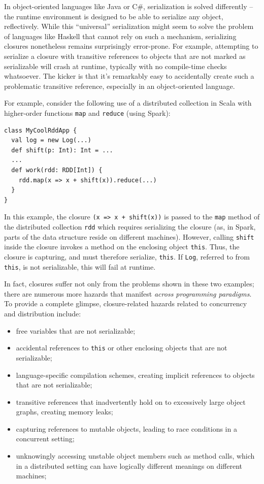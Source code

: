 \documentclass{llncs}
\begin{document}
In object-oriented languages like Java or C\#, serialization is solved
differently -- the runtime environment is designed to be able to serialize any
object, reflectively. While this ``universal'' serialization might seem to
solve the problem of languages like Haskell that cannot rely on such a
mechanism, serializing closures nonetheless remains surprisingly error-prone.
For example, attempting to serialize a closure with transitive references to
objects that are not marked as serializable will crash at runtime, typically
with no compile-time checks whatsoever. The kicker is that it's remarkably
easy to accidentally create such a problematic transitive reference,
especially in an object-oriented language.

For example, consider the following use of a distributed collection in Scala
with higher-order functions \verb|map| and \verb|reduce| (using Spark):

\begin{lstlisting}
class MyCoolRddApp {
  val log = new Log(...)
  def shift(p: Int): Int = ...
  ...
  def work(rdd: RDD[Int]) {
    rdd.map(x => x + shift(x)).reduce(...)
  }
}
\end{lstlisting}

In this example, the closure \verb|(x => x + shift(x))| is passed to the
\verb|map| method of the distributed collection \verb|rdd| which requires
serializing the closure (as, in Spark, parts of the data structure reside on
different machines). However, calling \verb|shift| inside the closure invokes
a method on the enclosing object \verb|this|. Thus, the closure is capturing,
and must therefore serialize, \verb|this|. If \verb|Log|, referred to from
\verb|this|, is not serializable, this will fail at runtime.

In fact, closures suffer not only from the problems shown in these two
examples; there are numerous more hazards that manifest {\em across
programming paradigms}. To provide a complete glimpse, closure-related hazards
related to concurrency and distribution include:


\vspace{-2mm}
\begin{itemize}
\item free variables that are not serializable;
\item accidental references to \verb|this| or other enclosing objects that are not serializable;
\item language-specific compilation schemes, creating implicit references to objects that are not serializable;
\item transitive references that inadvertently hold on to excessively large object graphs, creating memory leaks;
\item capturing references to mutable objects, leading to race conditions in a concurrent setting;
\item unknowingly accessing unstable object members such as method calls, which in a distributed setting can have logically different meanings on different machines;
\end{itemize}
\end{document}
